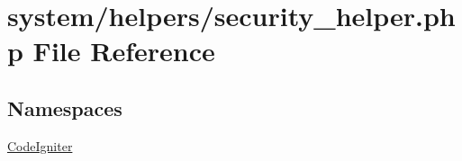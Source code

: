 \hypertarget{security__helper_8php}{}\section{system/helpers/security\+\_\+helper.php File Reference}
\label{security__helper_8php}
\subsection*{Namespaces}
\begin{DoxyCompactItemize}
\item 
 \mbox{\hyperlink{namespace_code_igniter}{Code\+Igniter}}
\end{DoxyCompactItemize}
